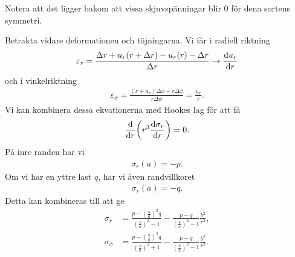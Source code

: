 Notera att det ligger bakom att vissa skjuvspänningar blir $0$ för dena sortens symmetri.

Betrakta vidare deformationen och töjningarna. Vi får i radiell riktning
\begin{align*}
	\varepsilon_{r} = \frac{\Delta r + u_{r}(r + \Delta r) - u_{r}(r) - \Delta r}{\Delta r} \to\dv{u_{r}}{r}
\end{align*}
och i vinkelriktning
\begin{align*}
	\varepsilon_{\phi} = \frac{(r + u_{r})\Delta\phi - r\Delta\phi}{r\Delta\phi} = \frac{u_{r}}{r}.
\end{align*}
Vi kan kombinera dessa ekvationerna med Hookes lag för att få
\begin{align*}
	\dv{r}(r^{3}\dv{\sigma_{r}}{r}) = 0.
\end{align*}
På inre randen har vi
\begin{align*}
	\sigma_{r}(a) = -p.
\end{align*}
Om vi har en yttre last $q$, har vi även randvillkoret
\begin{align*}
	\sigma_{r}(a) = -q.
\end{align*}
Detta kan kombineras till att ge
\begin{align*}
	\sigma_{r}    &= \frac{p - \left(\frac{b}{a}\right)^{2}q}{\left(\frac{b}{a}\right)^{2} - 1} - \frac{p - q}{\left(\frac{b}{a}\right)^{2} - 1}\frac{b^{2}}{r^{2}}, \\
	\sigma_{\phi} &= \frac{p - \left(\frac{b}{a}\right)^{2}q}{\left(\frac{b}{a}\right)^{2} + 1} - \frac{p - q}{\left(\frac{b}{a}\right)^{2} - 1}\frac{b^{2}}{r^{2}}.
\end{align*}